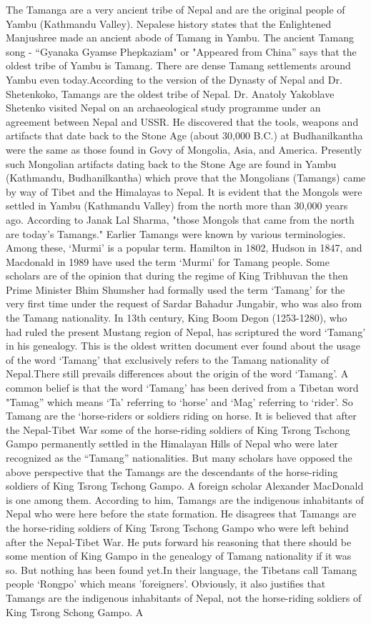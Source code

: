 \documentclass[a4paper,14pt]{article}
\begin{document}
\begin{flushleft}
	The Tamanga are a very ancient tribe of Nepal and are the original people of Yambu (Kathmandu Valley). Nepalese history states that the Enlightened Manjushree made an ancient abode of Tamang in Yambu. The ancient Tamang song - “Gyanaka Gyamse Phepkaziam" or "Appeared from China” says that the oldest tribe of Yambu is Tamang. There are dense Tamang settlements around Yambu even today.According to the version of the Dynasty of Nepal and Dr. Shetenkoko, Tamangs are the oldest tribe of Nepal. Dr. Anatoly Yakoblave Shetenko visited Nepal on an archaeological study programme under an agreement between Nepal and USSR. He discovered that the tools, weapons and artifacts that date back to the Stone Age (about 30,000 B.C.) at Budhanilkantha were the same as those found in Govy of Mongolia, Asia, and America. Presently such Mongolian artifacts dating back to the Stone Age are found in Yambu (Kathmandu, Budhanilkantha) which prove that the Mongolians (Tamangs) came by way of Tibet and the Himalayas to Nepal. It is evident that the Mongols were settled in Yambu (Kathmandu Valley) from the north more than 30,000 years ago. According to Janak Lal Sharma, "those Mongols that came from the north are today’s Tamangs." Earlier Tamangs were known by various terminologies. Among these, ‘Murmi’ is a popular term. Hamilton in 1802, Hudson in 1847, and Macdonald in 1989 have used the term ‘Murmi’ for Tamang people. Some scholars are of the opinion that during the regime of King Tribhuvan the then Prime Minister Bhim Shumsher had formally used the term ‘Tamang’ for the very first time under the request of Sardar Bahadur Jungabir, who was also from the Tamang nationality. In 13th century, King Boom Degon (1253-1280), who had ruled the present Mustang region of Nepal, has scriptured the word ‘Tamang’ in his genealogy. This is the oldest written document ever found about the usage of the word ‘Tamang’ that exclusively refers to the Tamang nationality of Nepal.There still prevails differences about the origin of the word ‘Tamang’. A common belief is that the word ‘Tamang’ has been derived from a Tibetan word "Tamag” which means ‘Ta’ referring to ‘horse’ and ‘Mag’ referring to ‘rider’. So Tamang are the ‘horse-riders or soldiers riding on horse. It is believed that after the Nepal-Tibet War some of the horse-riding soldiers of King Tsrong Tschong Gampo permanently settled in the Himalayan Hills of Nepal who were later recognized as the “Tamang” nationalities. But many scholars have opposed the above perspective that the Tamangs are the descendants of the horse-riding soldiers of King Tsrong Tschong Gampo. A foreign scholar Alexander MacDonald is one among them. According to him, Tamangs are the indigenous inhabitants of Nepal who were here before the state formation. He disagrees that Tamangs are the horse-riding soldiers of King Tsrong Tschong Gampo who were left behind after the Nepal-Tibet War. He puts forward his reasoning that there should be some mention of King Gampo in the genealogy of Tamang nationality if it was so. But nothing has been found yet.In their language, the Tibetans call Tamang people ‘Rongpo’ which means 'foreigners'. Obviously, it also justifies that Tamangs are the indigenous inhabitants of Nepal, not the horse-riding soldiers of King Tsrong Schong Gampo. A 
\end{flushleft}
\end{document}
